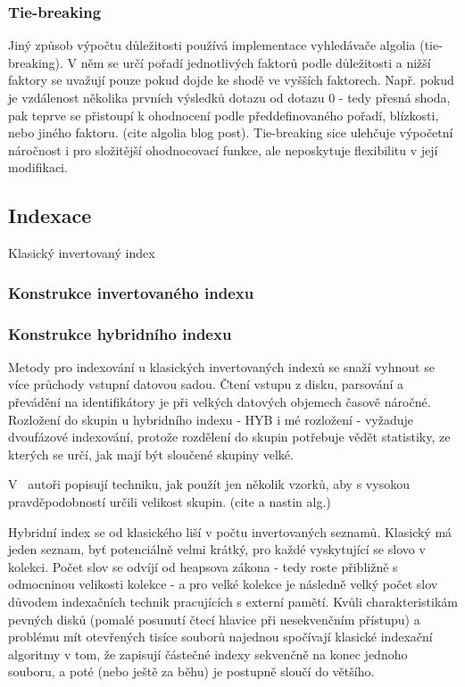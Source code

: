 \documentclass[11pt,letterpaper,oneside,openright]{book}
\begin{document}
\subsubsection{Tie-breaking}
Jiný způsob výpočtu důležitosti používá implementace vyhledávače algolia
(tie-breaking). V něm se určí pořadí jednotlivých faktorů podle důležitosti a
nižší faktory se uvažují pouze pokud dojde ke shodě ve vyšších faktorech. Např.
pokud je vzdálenost několika prvních výsledků dotazu od dotazu 0 - tedy přesná
shoda, pak teprve se přistoupí k ohodnocení podle předdefinovaného pořadí,
blízkosti, nebo jiného faktoru. (cite algolia blog post). Tie-breaking sice
ulehčuje výpočetní náročnost i pro složitější ohodnocovací funkce, ale
neposkytuje flexibilitu v její modifikaci.

\subsection{Indexace}
Klasický invertovaný index 
\subsubsection{Konstrukce invertovaného indexu}
\subsubsection{Konstrukce hybridního indexu}

Metody pro indexování u klasických invertovaných indexů se snaží vyhnout se
více průchody vstupní datovou sadou. Čtení vstupu z disku, parsování a
převádění na identifikátory je při velkých datových objemech časově náročné.
Rozložení do skupin u hybridního indexu - HYB i mé rozložení - vyžaduje
dvoufázové indexování, protože rozdělení do skupin potřebuje vědět statistiky,
ze kterých se určí, jak mají být sloučené skupiny velké.

V~\cite{Bast:2011:FCH:1993036.1993040} autoři popisují techniku, jak použít jen
několik vzorků, aby s vysokou pravděpodobností určili velikost skupin. (cite a
nastin alg.)

Hybridní index se od klasického liší v počtu invertovaných seznamů. Klasický má
jeden seznam, byť potenciálně velmi krátký, pro každé vyskytující se slovo v
kolekci. Počet slov se odvíjí od heapsova zákona - tedy roste přibližně s
odmocninou velikosti kolekce - a pro velké kolekce je následně velký počet slov
důvodem indexačních technik pracujících s externí pamětí. Kvůli
charakteristikám pevných disků (pomalé posunutí čtecí hlavice při nesekvenčním
přístupu) a problému mít otevřených tisíce souborů najednou spočívají klasické
indexační algoritmy v tom, že zapisují částečné indexy sekvenčně na konec
jednoho souboru, a poté (nebo ještě za běhu) je postupně sloučí do většího.
\end{document}
